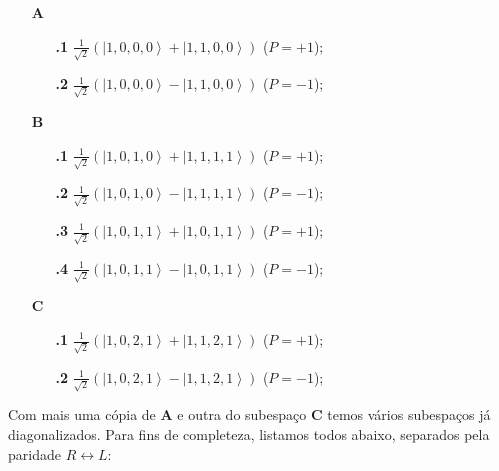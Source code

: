 \begin{itemize}
\item[\textbf{A}]
\begin{itemize}
\item[\textbf{.1}] $\frac{1}{\sqrt{2}}\left( \left| 1,0,0,0 \right> + \left| 1,1,0,0 \right> \right)$ ($P=+1$);
\item[\textbf{.2}] $\frac{1}{\sqrt{2}}\left( \left| 1,0,0,0 \right> - \left| 1,1,0,0 \right> \right)$ ($P=-1$);
\end{itemize}
\item[\textbf{B}]
\begin{itemize}
\item[\textbf{.1}] $\frac{1}{\sqrt{2}}\left( \left| 1,0,1,0 \right> + \left| 1,1,1,1 \right> \right)$ ($P=+1$);
\item[\textbf{.2}] $\frac{1}{\sqrt{2}}\left( \left| 1,0,1,0 \right> - \left| 1,1,1,1 \right> \right)$ ($P=-1$);
\item[\textbf{.3}] $\frac{1}{\sqrt{2}}\left( \left| 1,0,1,1 \right> + \left| 1,0,1,1 \right> \right)$ ($P=+1$);
\item[\textbf{.4}] $\frac{1}{\sqrt{2}}\left( \left| 1,0,1,1 \right> - \left| 1,0,1,1 \right> \right)$ ($P=-1$);
\end{itemize}
\item[\textbf{C}]
\begin{itemize}
\item[\textbf{.1}] $\frac{1}{\sqrt{2}}\left( \left| 1,0,2,1 \right> + \left| 1,1,2,1 \right> \right)$ ($P=+1$);
\item[\textbf{.2}] $\frac{1}{\sqrt{2}}\left( \left| 1,0,2,1 \right> - \left| 1,1,2,1 \right> \right)$ ($P=-1$);
\end{itemize}
\end{itemize}

Com mais uma cópia de \textbf{A} e outra do subespaço \textbf{C} temos vários subespaços já diagonalizados. Para fins de completeza, listamos todos abaixo, separados pela paridade $R \leftrightarrow L$:

